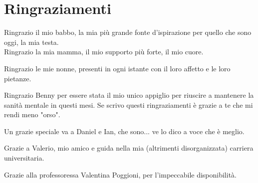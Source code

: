 %
\chapter*{Ringraziamenti}
\label{sec:declaration}
\thispagestyle{empty}


Ringrazio il mio babbo, la mia più grande fonte d'ispirazione per quello che sono oggi, la mia testa.\\
Ringrazio la mia mamma, il mio supporto più forte, il mio cuore.

Ringrazio le mie nonne, presenti in ogni istante con il loro affetto e le loro pietanze.

Ringrazio Benny per essere stata il mio unico appiglio per riuscire a mantenere la sanità mentale in questi mesi. Se scrivo questi ringraziamenti è grazie a te che mi rendi meno "orso".

Un grazie speciale va a Daniel e Ian, che sono... ve lo dico a voce che è meglio.

Grazie a Valerio, mio amico e guida nella mia (altrimenti disorganizzata) carriera universitaria.

Grazie alla professoressa Valentina Poggioni, per l'impeccabile disponibilità.






